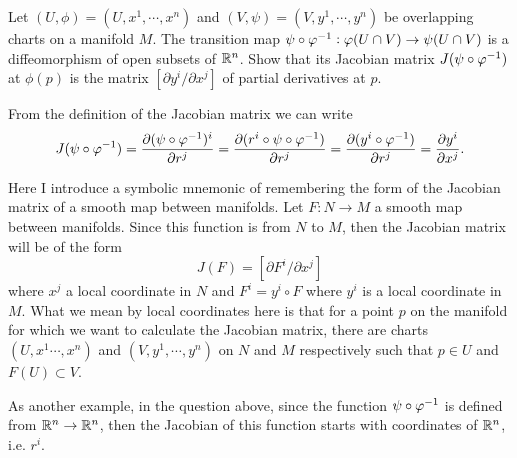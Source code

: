 \begin{problem}
	Let $ (U,\phi) = (U,x^1,\cdots,x^n) $ and $ (V,\psi) = (V,y^1,\cdots,y^n) $ be overlapping charts on a manifold $ M $. The transition map $ \psi \circ\varphi^{-1}: \varphi(U\cap V) \to \psi(U\cap V) $ is a diffeomorphism of open subsets of $ \mathbb{R}^n $. Show that its Jacobian matrix $ J(\psi\circ\varphi^{-1}) $ at $ \phi(p) $ is the matrix $ [\partial y^i/\partial x^j] $ of partial derivatives at $ p $.
\end{problem}
\begin{solution}
	From the definition of the Jacobian matrix we can write
	\[ J(\psi \circ \varphi^{-1}) = \frac{\partial (\psi \circ \varphi^{-1})^i}{\partial r^j} =  \frac{\partial (r^i \circ \psi \circ \varphi^{-1})}{\partial r^j} = \frac{\partial (y^i \circ \varphi^{-1})}{\partial r^j} = \frac{\partial y^i}{\partial x^j}. \]
\end{solution}

\begin{observation}
	Here I introduce a symbolic mnemonic of remembering the form of the Jacobian matrix of a smooth map between manifolds. Let $ F:N\to M $ a smooth map between manifolds. Since this function is from $ N $ to $ M $, then the Jacobian matrix will be of the form
	\[ J(F) = [\partial F^i / \partial x^j] \] 
	where $ x^j $ a local coordinate in $ N $ and $ F^i = y^i \circ F $ where $ y^i $ is a local coordinate in $ M $. What we mean by local coordinates here is that for a point $ p $ on the manifold for which we want to calculate the Jacobian matrix, there are charts $ (U,x^1\cdots,x^n) $ and $ (V,y^1,\cdots,y^n) $ on $ N $ and $ M $ respectively such that $ p \in U $ and $ F(U) \subset V $.
	
	As another example, in the question above, since the function $ \psi\circ\varphi^{-1} $ is defined from $ \mathbb{R}^n \to \mathbb{R}^n $, then the Jacobian of this function starts with coordinates of $ \mathbb{R}^n $, i.e. $ r^i $.
\end{observation}
